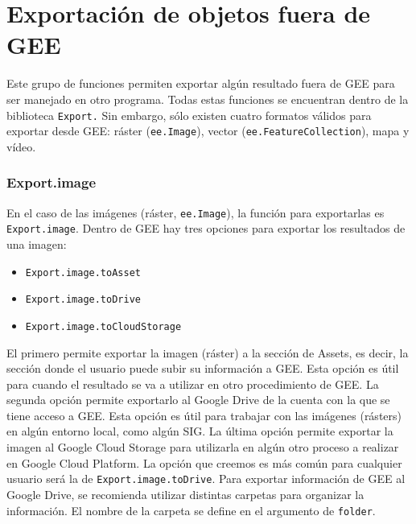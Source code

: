 \documentclass[
  12pt,
  letterpaper,
  twoside]{book}
\providecommand{\tightlist}{%
  \setlength{\itemsep}{0pt}\setlength{\parskip}{0pt}}
\begin{document}
\hypertarget{exportaciuxf3n-de-objetos-fuera-de-gee}{%
\section{Exportación de objetos fuera de GEE}\label{exportaciuxf3n-de-objetos-fuera-de-gee}}

Este grupo de funciones permiten exportar algún resultado fuera de GEE para ser manejado en otro programa. Todas estas funciones se encuentran dentro de la biblioteca \texttt{Export.} Sin embargo, sólo existen cuatro formatos válidos para exportar desde GEE: ráster (\texttt{ee.Image}), vector (\texttt{ee.FeatureCollection}), mapa y vídeo.

\hypertarget{export.image}{%
\subsubsection*{Export.image}\label{export.image}}

En el caso de las imágenes (ráster, \texttt{ee.Image}), la función para exportarlas es \texttt{Export.image}. Dentro de GEE hay tres opciones para exportar los resultados de una imagen:

\begin{itemize}
\tightlist
\item
  \texttt{Export.image.toAsset}
\item
  \texttt{Export.image.toDrive}
\item
  \texttt{Export.image.toCloudStorage}
\end{itemize}

El primero permite exportar la imagen (ráster) a la sección de Assets, es decir, la sección donde el usuario puede subir su información a GEE. Esta opción es útil para cuando el resultado se va a utilizar en otro procedimiento de GEE. La segunda opción permite exportarlo al Google Drive de la cuenta con la que se tiene acceso a GEE. Esta opción es útil para trabajar con las imágenes (rásters) en algún entorno local, como algún SIG. La última opción permite exportar la imagen al Google Cloud Storage para utilizarla en algún otro proceso a realizar en Google Cloud Platform. La opción que creemos es más común para cualquier usuario será la de \texttt{Export.image.toDrive}. Para exportar información de GEE al Google Drive, se recomienda utilizar distintas carpetas para organizar la información. El nombre de la carpeta se define en el argumento de \texttt{folder}.
\end{document}
